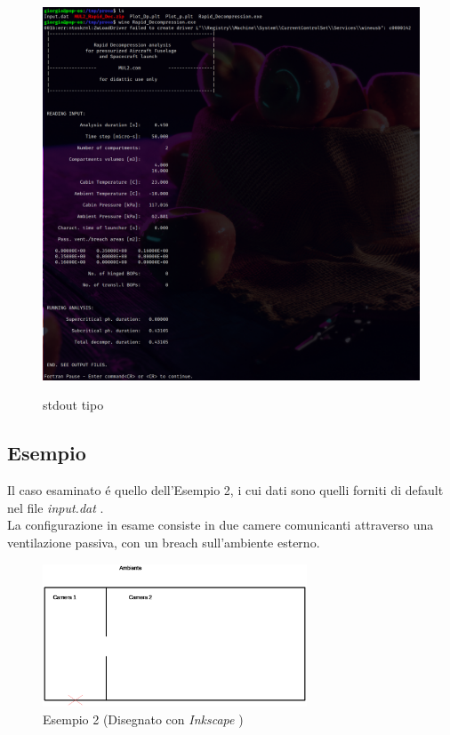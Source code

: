 \documentclass{article}
\begin{document}
    \begin{figure}[h!]
        \centering
        \label{fig:MUL2_stdout}
        \includegraphics[width=\textwidth]{MUL2_feedback.png}\\
        \caption{stdout tipo}
    \end{figure}
    




    \clearpage

        \subsection{Esempio}
        Il caso esaminato é quello dell'Esempio 2, i cui dati sono quelli
        forniti di default nel file \textit{input.dat} .\\
        La configurazione in esame consiste in due camere comunicanti attraverso
        una ventilazione passiva, con un breach sull'ambiente esterno. 
        \begin{figure}[h!]
            \centering
            \label{fig:Esempio_2}
            \includegraphics[width=0.7\textwidth]{ES1_Esempio2.eps}
            \caption{Esempio 2 (Disegnato con \textit{Inkscape} \autocite{Inkscape})}
        \end{figure}
\end{document}
